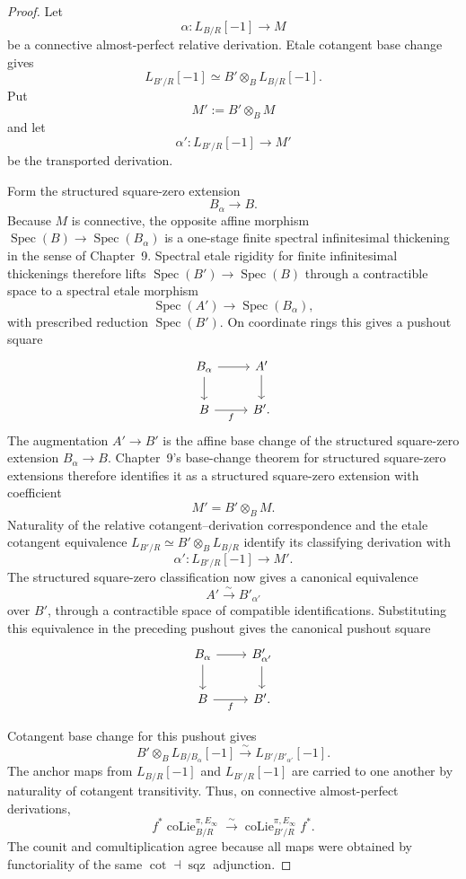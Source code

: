 \begin{proof}
Let
\[
    \alpha:L_{B/R}[-1]\longrightarrow M
\]
be a connective almost-perfect relative derivation.  Etale cotangent base
change gives
\[
    L_{B'/R}[-1]
    \simeq
    B'\otimes_BL_{B/R}[-1].
\]
Put
\[
    M':=B'\otimes_BM
\]
and let
\[
    \alpha':
    L_{B'/R}[-1]\longrightarrow M'
\]
be the transported derivation.

Form the structured square-zero extension
\[
    B_\alpha\longrightarrow B.
\]
Because $M$ is connective, the opposite affine morphism
$\operatorname{Spec}(B)\to\operatorname{Spec}(B_\alpha)$ is a one-stage
finite spectral infinitesimal thickening in the sense of Chapter~9.  Spectral
etale rigidity for finite infinitesimal thickenings therefore lifts
$\operatorname{Spec}(B')\to\operatorname{Spec}(B)$ through a contractible
space to a spectral etale morphism
\[
    \operatorname{Spec}(A')
    \longrightarrow
    \operatorname{Spec}(B_\alpha),
\]
with prescribed reduction $\operatorname{Spec}(B')$.  On coordinate rings
this gives a pushout square
\[
\begin{tikzcd}
B_\alpha \arrow[r] \arrow[d] &
A' \arrow[d]\\
B \arrow[r,"f"'] &
B'.
\end{tikzcd}
\]
The augmentation $A'\to B'$ is the affine base change of the structured
square-zero extension $B_\alpha\to B$.  Chapter~9's base-change theorem for
structured square-zero extensions therefore identifies it as a structured
square-zero extension with coefficient
\[
    M'=B'\otimes_BM.
\]
Naturality of the relative cotangent--derivation correspondence and the
etale cotangent equivalence
$L_{B'/R}\simeq B'\otimes_BL_{B/R}$ identify its classifying derivation with
\[
    \alpha':L_{B'/R}[-1]\longrightarrow M'.
\]
The structured square-zero classification now gives a canonical equivalence
\[
    A'\xrightarrow{\sim}B'_{\alpha'}
\]
over $B'$, through a contractible space of compatible identifications.
Substituting this equivalence in the preceding pushout gives the canonical
pushout square
\[
\begin{tikzcd}
B_\alpha \arrow[r] \arrow[d] &
B'_{\alpha'} \arrow[d]\\
B \arrow[r,"f"'] &
B'.
\end{tikzcd}
\]

Cotangent base change for this pushout gives
\[
\boxed{
    B'\otimes_B L_{B/B_\alpha}[-1]
    \xrightarrow{\sim}
    L_{B'/B'_{\alpha'}}[-1].}
\]
The anchor maps from $L_{B/R}[-1]$ and $L_{B'/R}[-1]$ are carried to one
another by naturality of cotangent transitivity.  Thus, on connective
almost-perfect derivations,
\[
\boxed{
    f^*\operatorname{coLie}^{\pi,E_\infty}_{B/R}
    \xrightarrow{\sim}
    \operatorname{coLie}^{\pi,E_\infty}_{B'/R}f^*.}
\]
The counit and comultiplication agree because all maps were obtained by
functoriality of the same
$\operatorname{cot}\dashv\operatorname{sqz}$ adjunction.


\end{proof}
